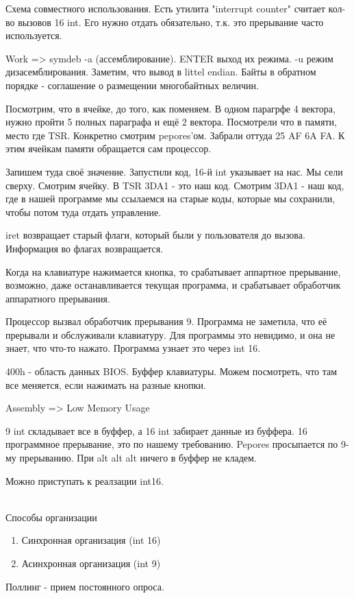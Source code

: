 Схема совместного использования.
Есть утилита "interrupt counter" считает кол-во вызовов 16 int. Его нужно отдать обязательно, т.к. это прерывание часто используется.

Work => symdeb -a (ассемблирование). ENTER выход их режима. -u режим дизасемблирования. Заметим, что вывод в littel endian. Байты в обратном порядке - соглашение о размещении многобайтных величин.

Посмотрим, что в ячейке, до того, как поменяем. В одном парагрфе 4 вектора, нужно пройти 5 полных параграфа и ещё 2 вектора. Посмотрели что в памяти, место где TSR. Конкретно смотрим pepores'ом. Забрали оттуда 25 AF 6A FA. К этим ячейкам памяти обращается сам процессор. 

Запишем туда своё значение. Запустили код, 16-й int указывает на нас. Мы сели сверху. Смотрим ячейку. В TSR 3DA1 - это наш код. Смотрим 3DA1 - наш код, где в нашей программе мы ссылаемся на старые коды, которые мы сохранили, чтобы потом туда отдать управление.

iret возвращает старый флаги, который были у пользователя до вызова. Информация во флагах возвращается. 

\begin{rem}
Когда на клавиатуре нажимается кнопка, то срабатывает аппартное прерывание, возможно, даже останавливается текущая программа, и срабатывает обработчик аппаратного прерывания. 
\end{rem}

Процессор вызвал обработчик прерывания 9. Программа не заметила, что её прерывали и обслуживали клавиатуру. Для программы это невидимо, и она не знает, что что-то нажато. Программа узнает это через int 16.

400h - область данных BIOS. Буффер клавиатуры. Можем посмотреть, что там все меняется, если нажимать на разные кнопки.  

Assembly => Low Memory Usage

9 int складывает все в буффер, а 16 int забирает данные из буффера. 
16 программное прерывание, это по нашему требованию. Pepores просыпается по 9-му прерыванию.
При alt alt alt ничего в буффер не кладем.

\begin{off}Можно приступать к реалзации int16.\end{off}
~\\
Способы организации
\begin{enumerate}
\item Синхронная организация (int 16)
\item Асинхронная организация (int 9)
\end{enumerate}
Поллинг - прием постоянного опроса.

